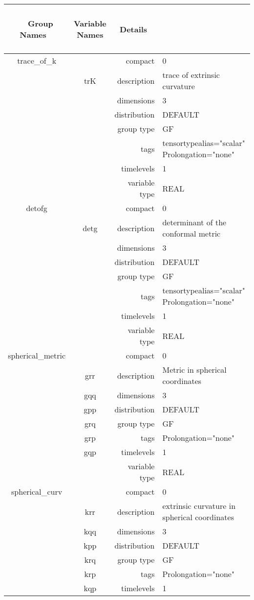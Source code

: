 \begin{tabular*}{150mm}{|c|c@{\extracolsep{\fill}}|rl|} \hline 
~ {\bf Group Names} ~ & ~ {\bf Variable Names} ~  &{\bf Details} ~ & ~\\ 
\hline 
trace\_of\_k &  & compact & 0 \\ 
 & trK & description & trace of extrinsic curvature \\ 
 &  & dimensions & 3 \\ 
 &  & distribution & DEFAULT \\ 
 &  & group type & GF \\ 
 &  & tags & tensortypealias="scalar" Prolongation="none" \\ 
 &  & timelevels & 1 \\ 
 &  & variable type & REAL \\ 
\hline 
detofg &  & compact & 0 \\ 
 & detg & description & determinant of the conformal metric \\ 
 &  & dimensions & 3 \\ 
 &  & distribution & DEFAULT \\ 
 &  & group type & GF \\ 
 &  & tags & tensortypealias="scalar" Prolongation="none" \\ 
 &  & timelevels & 1 \\ 
 &  & variable type & REAL \\ 
\hline 
spherical\_metric &  & compact & 0 \\ 
 & grr & description & Metric in spherical coordinates \\ 
 & gqq & dimensions & 3 \\ 
 & gpp & distribution & DEFAULT \\ 
 & grq & group type & GF \\ 
 & grp & tags & Prolongation="none" \\ 
 & gqp & timelevels & 1 \\ 
 &  & variable type & REAL \\ 
\hline 
spherical\_curv &  & compact & 0 \\ 
 & krr & description & extrinsic curvature in spherical coordinates \\ 
 & kqq & dimensions & 3 \\ 
 & kpp & distribution & DEFAULT \\ 
 & krq & group type & GF \\ 
 & krp & tags & Prolongation="none" \\ 
 & kqp & timelevels & 1 \\ 

\end{tabular*}
